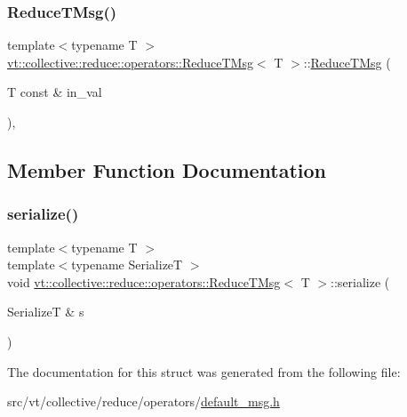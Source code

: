 \mbox{\label{structvt_1_1collective_1_1reduce_1_1operators_1_1_reduce_t_msg_adf385a9e59ac02aa23ae173b89a6c075}} 
\subsubsection{\texorpdfstring{Reduce\+T\+Msg()}{ReduceTMsg()}\hspace{0.1cm}{\footnotesize\ttfamily [3/3]}}
{\footnotesize\ttfamily template$<$typename T $>$ \\
\hyperlink{structvt_1_1collective_1_1reduce_1_1operators_1_1_reduce_t_msg}{vt\+::collective\+::reduce\+::operators\+::\+Reduce\+T\+Msg}$<$ T $>$\+::\hyperlink{structvt_1_1collective_1_1reduce_1_1operators_1_1_reduce_t_msg}{Reduce\+T\+Msg} (\begin{DoxyParamCaption}\item[{T const \&}]{in\+\_\+val }\end{DoxyParamCaption})\hspace{0.3cm}{\ttfamily [inline]}, {\ttfamily [explicit]}}



\subsection{Member Function Documentation}
\mbox{\label{structvt_1_1collective_1_1reduce_1_1operators_1_1_reduce_t_msg_a00e2a6db0204015f48c57685e8aa8beb}} 
\subsubsection{\texorpdfstring{serialize()}{serialize()}}
{\footnotesize\ttfamily template$<$typename T $>$ \\
template$<$typename SerializeT $>$ \\
void \hyperlink{structvt_1_1collective_1_1reduce_1_1operators_1_1_reduce_t_msg}{vt\+::collective\+::reduce\+::operators\+::\+Reduce\+T\+Msg}$<$ T $>$\+::serialize (\begin{DoxyParamCaption}\item[{SerializeT \&}]{s }\end{DoxyParamCaption})\hspace{0.3cm}{\ttfamily [inline]}}



The documentation for this struct was generated from the following file\+:\begin{DoxyCompactItemize}
\item 
src/vt/collective/reduce/operators/\hyperlink{default__msg_8h}{default\+\_\+msg.\+h}\end{DoxyCompactItemize}
